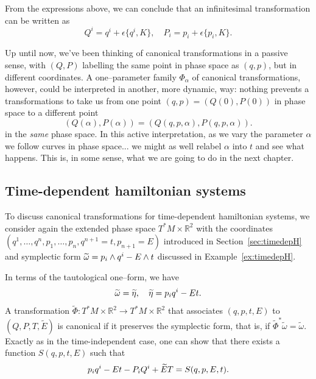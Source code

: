\documentclass[english,fontsize=11pt,paper=a5,oneside]{scrbook}
\newcommand{\R}{\mathbb{R}}
\let\d\relax
\newcommand{\d}{\mathrm{d}}
\theoremstyle{definition}
\begin{document}
From the expressions above, we can conclude that an infinitesimal transformation can be written as
\begin{equation}\label{eq:forminfct}
  Q^i = q^i + \epsilon \big\{q^i, K\big\}, \quad
  P_i = p_i + \epsilon \big\{p_i, K\big\}.
\end{equation}

Up until now, we've been thinking of canonical transformations in a passive sense, with $(Q,P)$ labelling the same point in phase space as $(q, p)$, but in different coordinates.
A one--parameter family $\Phi_\alpha$ of canonical transformations, however, could be interpreted in another, more dynamic, way: nothing prevents a transformations to take us from one point $(q,p)=(Q(0), P(0))$ in phase space to a different point
\begin{equation}
  (Q(\alpha),P(\alpha)) = (Q(q,p,\alpha), P(q,p,\alpha)).
\end{equation}
in the \emph{same} phase space.
In this active interpretation, as we vary the parameter $\alpha$ we follow curves in phase space... we might as well relabel $\alpha$ into $t$ and see what happens.
This is, in some sense, what we are going to do in the next chapter.

\subsection{Time-dependent hamiltonian systems}

To discuss canonical transformations for time-dependent hamiltonian systems, we consider again the extended phase space $T^*M\times \R^2$ with the coordinates $(q^1,\ldots,q^n,p_1,\ldots,p_n, q^{n+1}=t, p_{n+1}=E)$ introduced in Section~\ref{sec:timedepH} and symplectic form  $\widetilde\omega = \d p_i\wedge \d q^i - \d E\wedge \d t$ discussed in Example~\ref{ex:timedepH}.

In terms of the tautological one--form, we have
\begin{equation}
  \widetilde\omega = \d \widetilde\eta, \quad \widetilde\eta = p_i \d q^i - E \d t.
\end{equation}
A transformation $\widetilde\Phi : T^*M\times \R^2 \to T^*M\times \R^2$ that associates $(q,p,t,E)$ to $(Q,P,T,\widetilde E)$ is canonical if it preserves the symplectic form, that is, if ${\widetilde\Phi}^* \widetilde \omega = \widetilde \omega$. Exactly as in the time-independent case, one can show that there exists a function $S(q,p,t,E)$ such that
\begin{equation}\label{eq:timedepgen}
  p_i \d q^i -E \d t - P_i \d Q^i + \widetilde E \d T = \d S(q,p,E,t).
\end{equation}
\end{document}
